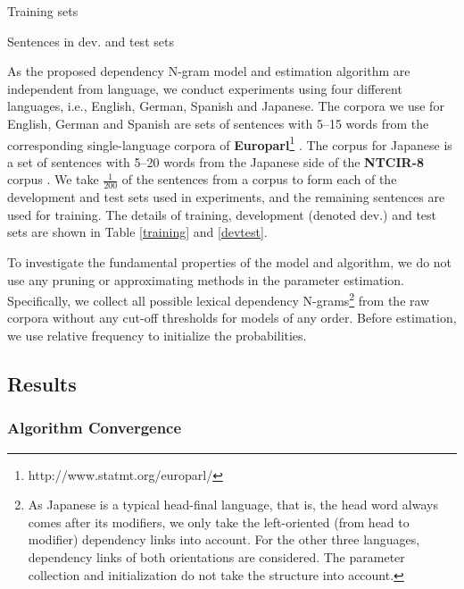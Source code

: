 \documentclass[english]{jnlp_1.4}
\begin{document}
\begin{table}[b]
\vspace{-0.5\Cvs}
\begin{minipage}[b]{.55\textwidth}
\caption{Training sets}
\label{training}

\end{minipage}
\hfill
\begin{minipage}[b]{.40\textwidth}
\caption{Sentences in dev. and test sets}
\label{devtest}

\end{minipage}
\end{table}

As the proposed dependency N-gram model and estimation algorithm are independent from language, we conduct experiments using four different languages, i.e., English, German, Spanish and Japanese. The corpora we use for English, German and Spanish are sets of sentences with 5--15 words from the corresponding single-language corpora of {\bf{Europarl}}\footnote{http://www.statmt.org/europarl/} \cite{koehn2005europarl}. The corpus for Japanese is a set of sentences with 5--20 words from the Japanese side of the {\bf{NTCIR-8}} corpus \cite{yamamoto2010}. We take $\frac{1}{200}$ of the sentences from a corpus to form each of the development and test sets used in experiments, and the remaining sentences are used for training. The details of training, development (denoted dev.) and test sets are shown in Table \ref{training} and \ref{devtest}.

To investigate the fundamental properties of the model and algorithm, we do not use any pruning or approximating methods in the parameter estimation. Specifically, we collect all possible lexical dependency N-grams\footnote{As Japanese is a typical head-final language, that is, the head word always comes after its modifiers, we only take the left-oriented (from head to modifier) dependency links into account. For the other three languages, dependency links of both orientations are considered. The parameter collection and initialization do not take the structure into account.} from the raw corpora without any cut-off thresholds for models of any order. Before estimation, we use relative frequency to initialize the probabilities.


\subsection{Results}

\subsubsection{Algorithm Convergence}
\end{document}

